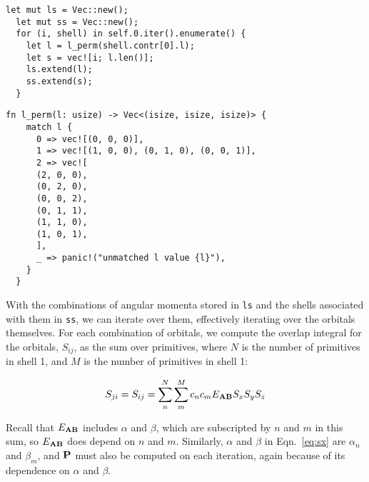 \documentclass{achemso}
\newcommand\eab{E_{\vb A \vb B}}
\begin{document}
\begin{lstlisting}[caption={Collecting $l$ values for shells}, label={lst:ls}]
  let mut ls = Vec::new();
  let mut ss = Vec::new();
  for (i, shell) in self.0.iter().enumerate() {
    let l = l_perm(shell.contr[0].l);
    let s = vec![i; l.len()];
    ls.extend(l);
    ss.extend(s);
  }
\end{lstlisting}

\begin{lstlisting}[caption={l\_perm}, label={lst:lperm}]
  fn l_perm(l: usize) -> Vec<(isize, isize, isize)> {
    match l {
      0 => vec![(0, 0, 0)],
      1 => vec![(1, 0, 0), (0, 1, 0), (0, 0, 1)],
      2 => vec![
      (2, 0, 0),
      (0, 2, 0),
      (0, 0, 2),
      (0, 1, 1),
      (1, 1, 0),
      (1, 0, 1),
      ],
      _ => panic!("unmatched l value {l}"),
    }
  }
\end{lstlisting}

With the combinations of angular momenta stored in \verb|ls| and the shells
associated with them in \verb|ss|, we can iterate over them, effectively
iterating over the orbitals themselves. For each combination of orbitals, we
compute the overlap integral for the orbitals, $S_{ij}$, as the sum over
primitives, where $N$ is the number of primitives in shell 1, and $M$ is the
number of primitives in shell 1:

\begin{equation}
  \label{eq:sij}
  S_{ji} = S_{ij} = \sum_n^N\sum_m^M c_n c_m E_{\vb A \vb B} S_x S_y S_z
\end{equation}

Recall that $\eab$ includes $\alpha$ and $\beta$, which are subscripted by $n$
and $m$ in this sum, so $\eab$ does depend on $n$ and $m$. Similarly, $\alpha$
and $\beta$ in Eqn.~\ref{eq:sx} are $\alpha_n$ and $\beta_m$, and $\vb P$ must
also be computed on each iteration, again because of its dependence on $\alpha$
and $\beta$.


\end{document}
